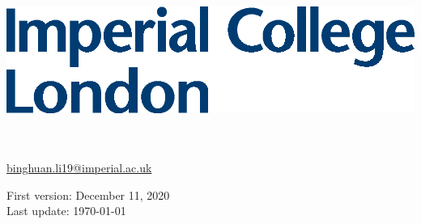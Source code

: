 \begin{titlepage}
\Large

\begin{minipage}{0.4\textwidth}
    \includegraphics[width=\textwidth]{images/Imperial.eps}
\end{minipage}

\vspace{1.5cm}

\begin{center}
        \vspace{2cm}
        {\Huge \textbf{\textit{\doc}}}\\
        \vspace{5cm}
        \textit{\docAuthor}\\
        \href{mailto:binghuan.li19@imperial.ac.uk}{binghuan.li19@imperial.ac.uk}

        \vspace{3cm}
        First version: December 11, 2020 \\
        Last update: \today
        \vfill
\end{center}

\end{titlepage}